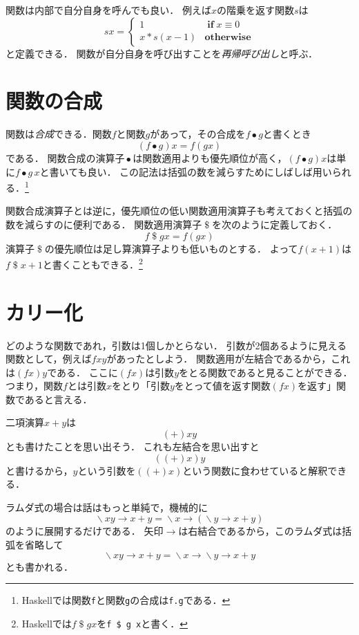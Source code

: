 \documentclass[twocolumn]{jsbook}
\newcommand{\mathKeyword}[1]{\mathbf{#1}}
\DeclareMathOperator{\mathApply}{\$}
\DeclareMathOperator{\mathCompose}{\bullet}
\DeclareMathOperator{\mathIf}{\mathKeyword{if}}
\DeclareMathOperator{\mathLambda}{\backslash}
\newcommand{\mathLambdaArrow}{\rightarrow}
\newcommand{\mathOtherwise}{\mathKeyword{otherwise}}
\newcommand{\mathLambdaExpression}[2]{\mathLambda#1\mathLambdaArrow#2}
\newcommand{\keyword}[1]{\emph{#1}}
\newcommand{\code}[1]{\texttt{#1}}
\begin{document}
関数は内部で自分自身を呼んでも良い．
例えば$x$の階乗を返す関数$s$は
\begin{equation*}
sx=\begin{cases}
1&\mathIf x\equiv0\\
x*s(x-1)&\mathOtherwise
\end{cases}
\end{equation*}
と定義できる．
関数が自分自身を呼び出すことを\keyword{再帰呼び出し}と呼ぶ．

\section{関数の合成}

関数は\keyword{合成}できる．関数$f$と関数$g$があって，その合成を$f\mathCompose g$と書くとき$$(f\mathCompose g)x=f(gx)$$である．
関数合成の演算子$\mathCompose$は関数適用よりも優先順位が高く，$(f\mathCompose g)x$は単に$f\mathCompose g\,x$と書いても良い．
この記法は括弧の数を減らすためにしばしば用いられる．\footnote{Haskellでは関数\code{f}と関数\code{g}の合成は\code{f.g}である．}

関数合成演算子とは逆に，優先順位の低い関数適用演算子も考えておくと括弧の数を減らすのに便利である．
関数適用演算子$\mathApply$を次のように定義しておく．
$$f\mathApply gx=f(gx)$$
演算子$\mathApply$の優先順位は足し算演算子よりも低いものとする．
よって$f(x+1)$は$f\mathApply x+1$と書くこともできる．\footnote{Haskellでは$f\mathApply gx$を\code{f \$ g x}と書く．}

\section{カリー化}

どのような関数であれ，引数は1個しかとらない．
引数が2個あるように見える関数として，例えば$fxy$があったとしよう．
関数適用が左結合であるから，これは$(fx)y$である．
ここに$(fx)$は引数$y$をとる関数であると見ることができる．
つまり，関数$f$とは引数$x$をとり「引数$y$をとって値を返す関数$(fx)$を返す」関数であると言える．

二項演算$x+y$は$$(+)xy$$とも書けたことを思い出そう．
これも左結合を思い出すと$$((+)x)y$$と書けるから，$y$という引数を$((+)x)$という関数に食わせていると解釈できる．

ラムダ式の場合は話はもっと単純で，機械的に$$\mathLambdaExpression{xy}{x+y}=\mathLambdaExpression{x}{(\mathLambdaExpression{y}{x+y})}$$のように展開するだけである．
矢印$\mathLambdaArrow$は右結合であるから，このラムダ式は括弧を省略して$$\mathLambdaExpression{xy}{x+y}=\mathLambdaExpression{x}{\mathLambdaExpression{y}{x+y}}$$とも書かれる．
\end{document}
